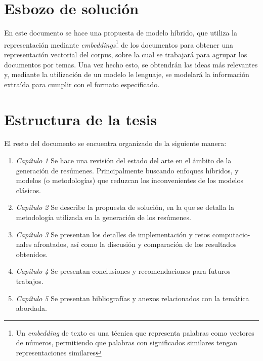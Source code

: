 \section{Esbozo de solución}
    En este documento se hace una propuesta de modelo híbrido, que utiliza la representación mediante \emph{embeddings}\footnote{Un \emph{embedding} de texto es una técnica que representa palabras como vectores de números, permitiendo que palabras con significados similares tengan representaciones similares}
    de los documentos para obtener una representación vectorial del corpus, sobre la cual se trabajará para agrupar los documentos por temas. Una vez hecho esto, se obtendrán las ideas más relevantes y, mediante la utilización de un modelo le lenguaje, se modelará la información extraída para cumplir con el formato especificado.

\section{Estructura de la tesis}
        El resto del documento se encuentra organizado de la siguiente manera:

        \begin{enumerate}
            \item \emph{Capítulo 1} Se hace una revisión del estado del arte en el ámbito de la generación de resúmenes. Principalmente buscando enfoques híbridos, y modelos (o metodologías) que reduzcan los inconvenientes de los modelos clásicos.
            \item \emph{Capítulo 2} Se describe la propuesta de solución, en la que se detalla la metodología utilizada en la generación de los resúmenes.
            \item \emph{Capítulo 3} Se presentan los detalles de implementación y retos computacio-
            nales afrontados, así como la discusión y comparación de los resultados obtenidos.
            \item \emph{Capítulo 4} Se presentan conclusiones y recomendaciones para futuros trabajos.
            \item \emph{Capítulo 5} Se presentan bibliografías y anexos relacionados con la temática abordada.
        \end{enumerate}


